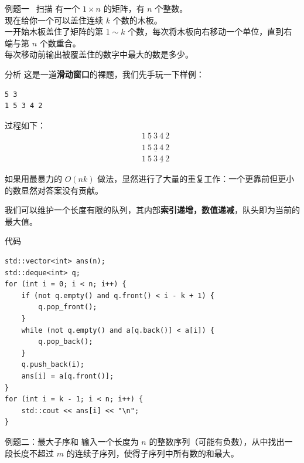 \documentclass{beamer}
\begin{document}
\begin{frame}{例题一 \ 扫描}
    有一个 $1 \times n$ 的矩阵，有 $n$ 个整数。\\

    现在给你一个可以盖住连续 $k$ 个数的木板。\\

    一开始木板盖住了矩阵的第 $1 \sim k$ 个数，每次将木板向右移动一个单位，直到右端与第 $n$ 个数重合。\\

    每次移动前输出被覆盖住的数字中最大的数是多少。
\end{frame}

\begin{frame}[fragile]{分析}
    这是一道\textbf{滑动窗口}的裸题，我们先手玩一下样例：

    \begin{verbatim}
5 3
1 5 3 4 2
    \end{verbatim}

    过程如下：
    $$
    \begin{aligned}
        & \underline{1 \ \boxed{5} \ 3} \ 4 \ 2 \\
        & 1 \ \underline{\boxed{5} \ 3 \ 4} \ 2 \\
        & 1 \ 5 \ \underline{3 \ \boxed{4} \ 2}
    \end{aligned}
    $$

    如果用最暴力的 $O(n k)$ 做法，显然进行了大量的重复工作：一个更靠前但更小的数显然对答案没有贡献。

    我们可以维护一个长度有限的队列，其内部\textbf{索引递增，数值递减}，队头即为当前的最大值。
\end{frame}

\begin{frame}[fragile]{代码}
    \begin{verbatim}
std::vector<int> ans(n);
std::deque<int> q;
for (int i = 0; i < n; i++) {
    if (not q.empty() and q.front() < i - k + 1) {
        q.pop_front();
    }
    while (not q.empty() and a[q.back()] < a[i]) {
        q.pop_back();
    }
    q.push_back(i);
    ans[i] = a[q.front()];
}
for (int i = k - 1; i < n; i++) {
    std::cout << ans[i] << "\n";
}
    \end{verbatim}
\end{frame}

\begin{frame}{例题二：最大子序和}
    输入一个长度为 $n$ 的整数序列（可能有负数），从中找出一段长度不超过 $m$ 的连续子序列，使得子序列中所有数的和最大。
\end{frame}
\end{document}
